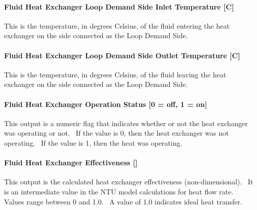\paragraph{Fluid Heat Exchanger Loop Demand Side Inlet Temperature {[}C{]}}\label{fluid-heat-exchanger-loop-demand-side-inlet-temperature-c}

This is the temperature, in degrees Celsius, of the fluid entering the heat exchanger on the side connected as the Loop Demand Side.

\paragraph{Fluid Heat Exchanger Loop Demand Side Outlet Temperature {[}C{]}}\label{fluid-heat-exchanger-loop-demand-side-outlet-temperature-c}

This is the temperature, in degrees Celsius, of the fluid leaving the heat exchanger on the side connected as the Loop Demand Side.

\paragraph{Fluid Heat Exchanger Operation Status {[}0 = off, 1 = on{]}}\label{fluid-heat-exchanger-operation-status-0-off-1-on}

This output is a numeric flag that indicates whether or not the heat exchanger was operating or not.~ If the value is 0, then the heat exchanger was not operating.~ If the value is 1, then the heat was operating.

\paragraph{Fluid Heat Exchanger Effectiveness {[]}}\label{fluid-heat-exchanger-effectiveness}

This output is the calculated heat exchanger effectiveness (non-dimensional).~ It is an intermediate value in the NTU model calculations for heat flow rate.~ Values range between 0 and 1.0.~ A value of 1.0 indicates ideal heat transfer.
